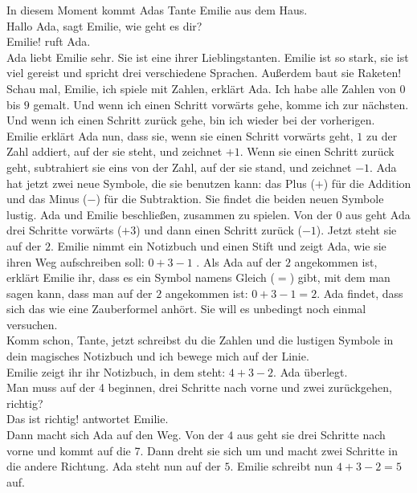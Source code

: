 In diesem Moment kommt Adas Tante Emilie aus dem Haus. \\
\frqq{}Hallo Ada\flqq{}, sagt Emilie, \frqq{}wie geht es dir?\flqq{}\\
\frqq{}Emilie!\flqq{} ruft Ada.\\
Ada liebt Emilie sehr. Sie ist eine ihrer Lieblingstanten. Emilie ist so stark, sie ist viel gereist und spricht drei verschiedene Sprachen. Außerdem baut sie Raketen!\\
\frqq{}Schau mal, Emilie, ich spiele mit Zahlen\flqq{}, erklärt Ada. \frqq{}Ich habe alle Zahlen von $0$ bis $9$ gemalt. Und wenn ich einen Schritt vorwärts gehe, komme ich zur nächsten. Und wenn ich einen Schritt zurück gehe, bin ich wieder bei der vorherigen.\flqq{}\\
Emilie erklärt Ada nun, dass sie, wenn sie einen Schritt vorwärts geht, $1$ zu der Zahl addiert, auf der sie steht, und zeichnet $+1$. Wenn sie einen Schritt zurück geht, subtrahiert sie eins von der Zahl, auf der sie stand, und zeichnet $-1$. Ada hat jetzt zwei neue Symbole, die sie benutzen kann: das Plus ($+$) für die Addition und das Minus ($-$) für die Subtraktion. Sie findet die beiden neuen Symbole lustig. 
Ada und Emilie beschließen, zusammen zu spielen. Von der $0$ aus geht Ada drei Schritte vorwärts ($+3$) und dann einen Schritt zurück ($-1$). Jetzt steht sie auf der $2$. Emilie nimmt ein Notizbuch und einen Stift und zeigt Ada, wie sie ihren Weg aufschreiben soll: $0 + 3 - 1$ . Als Ada auf der $2$ angekommen ist, erklärt Emilie ihr, dass es ein Symbol namens Gleich ($=$) gibt, mit dem man sagen kann, dass man auf der $2$ angekommen ist: $0 + 3 - 1 = 2$. Ada findet, dass sich das wie eine Zauberformel anhört. Sie will es unbedingt noch einmal versuchen. \\
\frqq{}Komm schon, Tante, jetzt schreibst du die Zahlen und die lustigen Symbole in dein magisches Notizbuch und ich bewege mich auf der Linie.\flqq{} \\
Emilie zeigt ihr ihr Notizbuch, in dem steht: $4 + 3 - 2$. Ada überlegt. \\
\frqq{}Man muss auf der 4 beginnen, drei Schritte nach vorne und zwei zurückgehen, richtig?\flqq{} \\
\frqq{} Das ist richtig!\flqq{} antwortet Emilie.\\
Dann macht sich Ada auf den Weg. Von der $4$ aus geht sie drei Schritte nach vorne und kommt auf die 7. Dann dreht sie sich um und macht zwei Schritte in die andere Richtung. Ada steht nun auf der $5$. Emilie schreibt nun $4 + 3 - 2 = 5$ auf.\\
